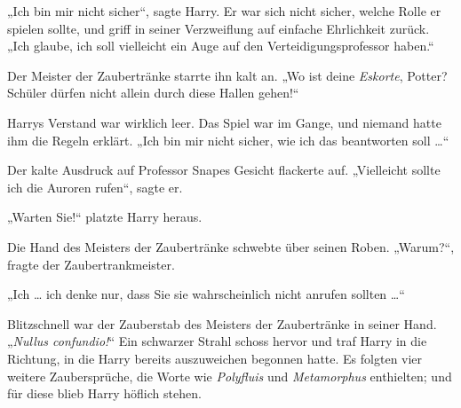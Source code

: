 „Ich bin mir nicht sicher“, sagte Harry.
Er war sich nicht sicher, welche Rolle er spielen sollte, und griff in seiner Verzweiflung auf einfache Ehrlichkeit zurück.
„Ich glaube, ich soll vielleicht ein Auge auf den Verteidigungsprofessor haben.“

Der Meister der Zaubertränke starrte ihn kalt an.
„Wo ist deine \emph{Eskorte}, Potter? Schüler dürfen nicht allein durch diese Hallen gehen!“

Harrys Verstand war wirklich leer. Das Spiel war im Gange, und niemand hatte ihm die Regeln erklärt.
„Ich bin mir nicht sicher, wie ich das beantworten soll …“

Der kalte Ausdruck auf Professor Snapes Gesicht flackerte auf.
„Vielleicht sollte ich die Auroren rufen“, sagte er.

„Warten Sie!“ platzte Harry heraus.

Die Hand des Meisters der Zaubertränke schwebte über seinen Roben.
„Warum?“, fragte der Zaubertrankmeister.

„Ich … ich denke nur, dass Sie sie wahrscheinlich nicht anrufen sollten …“

Blitzschnell war der Zauberstab des Meisters der Zaubertränke in seiner Hand.
„\emph{Nullus confundio!}“
Ein schwarzer Strahl schoss hervor und traf Harry in die Richtung, in die Harry bereits auszuweichen begonnen hatte. Es folgten vier weitere Zaubersprüche, die Worte wie \emph{Polyfluis} und \emph{Metamorphus} enthielten; und für diese blieb Harry höflich stehen.

